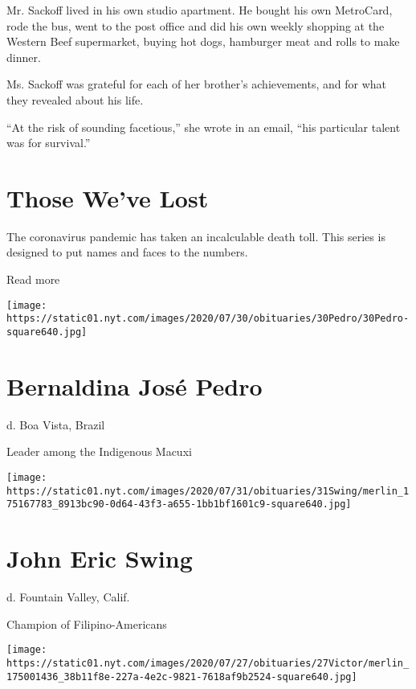 Mr. Sackoff lived in his own studio apartment. He bought his own
MetroCard, rode the bus, went to the post office and did his own weekly
shopping at the Western Beef supermarket, buying hot dogs, hamburger
meat and rolls to make dinner.

Ms. Sackoff was grateful for each of her brother's achievements, and for
what they revealed about his life.

``At the risk of sounding facetious,'' she wrote in an email, ``his
particular talent was for survival.''

\href{https://www.nytimes.com/interactive/2020/obituaries/people-died-coronavirus-obituaries.html?action=click\&pgtype=Article\&state=default\&region=BELOW_MAIN_CONTENT\&context=covid_obits_promo}{}

\hypertarget{those-weve-lost}{%
\section{Those We've Lost}\label{those-weve-lost}}

The coronavirus pandemic has taken an incalculable death toll. This
series is designed to put names and faces to the numbers.

Read more

\texttt{[image: https://static01.nyt.com/images/2020/07/30/obituaries/30Pedro/30Pedro-square640.jpg]}

\hypertarget{bernaldina-josuxe9-pedro}{%
\section{Bernaldina José Pedro}\label{bernaldina-josuxe9-pedro}}

d. Boa Vista, Brazil

Leader among the Indigenous Macuxi

\texttt{[image: https://static01.nyt.com/images/2020/07/31/obituaries/31Swing/merlin\_175167783\_8913bc90-0d64-43f3-a655-1bb1bf1601c9-square640.jpg]}

\hypertarget{john-eric-swing}{%
\section{John Eric Swing}\label{john-eric-swing}}

d. Fountain Valley, Calif.

Champion of Filipino-Americans

\texttt{[image: https://static01.nyt.com/images/2020/07/27/obituaries/27Victor/merlin\_175001436\_38b11f8e-227a-4e2c-9821-7618af9b2524-square640.jpg]}

